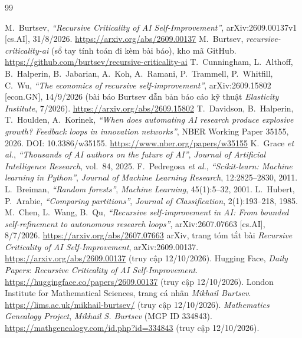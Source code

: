 \documentclass[12pt,a4paper,openany]{report}
\numberwithin{equation}{chapter}   %
\theoremstyle{definition}
\newcommand{\en}[1]{\textit{#1}}   %
\begin{document}
\begin{thebibliography}{99}
 M.~Burtsev, \en{``Recursive Criticality of AI Self-Improvement''}, arXiv:2609.00137v1 [cs.AI], 31/8/2026. \url{https://arxiv.org/abs/2609.00137}
 M.~Burtsev, \en{recursive-criticality-ai} (sổ tay tính toán đi kèm bài báo), kho mã GitHub. \url{https://github.com/burtsev/recursive-criticality-ai}
 T.~Cunningham, L.~Althoff, B.~Halperin, B.~Jabarian, A.~Koh, A.~Ramani, P.~Trammell, P.~Whitfill, C.~Wu, \en{``The economics of recursive self-improvement''}, arXiv:2609.15802 [econ.GN], 14/9/2026 (bài báo Burtsev dẫn bản báo cáo kỹ thuật \en{Elasticity Institute}, 7/2026). \url{https://arxiv.org/abs/2609.15802}
 T.~Davidson, B.~Halperin, T.~Houlden, A.~Korinek, \en{``When does automating AI research produce explosive growth? Feedback loops in innovation networks''}, NBER Working Paper 35155, 2026. DOI: 10.3386/w35155. \url{https://www.nber.org/papers/w35155}
 K.~Grace \en{et al.}, \en{``Thousands of AI authors on the future of AI''}, \en{Journal of Artificial Intelligence Research}, vol.~84, 2025.
 F.~Pedregosa \en{et al.}, \en{``Scikit-learn: Machine learning in Python''}, \en{Journal of Machine Learning Research}, 12:2825--2830, 2011.
 L.~Breiman, \en{``Random forests''}, \en{Machine Learning}, 45(1):5--32, 2001.
 L.~Hubert, P.~Arabie, \en{``Comparing partitions''}, \en{Journal of Classification}, 2(1):193--218, 1985.
 M.~Chen, L.~Wang, B.~Qu, \en{``Recursive self-improvement in AI: From bounded self-refinement to autonomous research loops''}, arXiv:2607.07663 [cs.AI], 8/7/2026. \url{https://arxiv.org/abs/2607.07663}
 arXiv, trang tóm tắt bài \en{Recursive Criticality of AI Self-Improvement}, arXiv:2609.00137. \url{https://arxiv.org/abs/2609.00137} (truy cập 12/10/2026).
 Hugging Face, \en{Daily Papers}: \en{Recursive Criticality of AI Self-Improvement}. \url{https://huggingface.co/papers/2609.00137} (truy cập 12/10/2026).
 London Institute for Mathematical Sciences, trang cá nhân \en{Mikhail Burtsev}. \url{https://lims.ac.uk/mikhail-burtsev/} (truy cập 12/10/2026).
 \en{Mathematics Genealogy Project}, \en{Mikhail S. Burtsev} (MGP ID 334843). \url{https://mathgenealogy.com/id.php?id=334843} (truy cập 12/10/2026).

\end{thebibliography}
\end{document}
